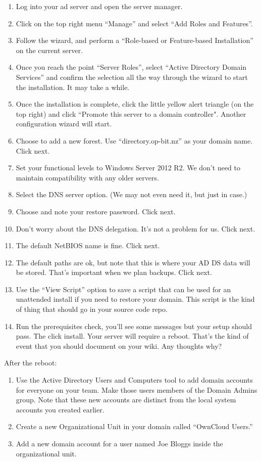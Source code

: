 \documentclass{article}
\begin{document}
\begin{enumerate}
	\item Log into your ad server and open the server manager.
	\item Click on the top right menu ``Manage'' and select ``Add Roles and Features''.
	\item Follow the wizard, and perform a ``Role-based or Feature-based Installation'' on the current server.
	\item Once you reach the point ``Server Roles'', select ``Active Directory Domain Services'' and confirm the selection all the way through the wizard to start the installation. It may take a while.
	\item Once the installation is complete, click the little yellow alert triangle (on the top right) and click ``Promote this server to a domain controller". Another configuration wizard will start.
	\item Choose to add a new forest. Use ``directory.op-bit.nz'' as your domain name. Click next.
	\item Set your functional levels to Windows Server 2012 R2. We don't need to maintain compatibility with any older servers.
	\item Select the DNS server option. (We may not even need it, but just in case.)
	\item Choose and note your restore password. Click next.
	\item Don't worry about the DNS delegation. It's not a problem for us. Click next.
	\item The default NetBIOS name is fine. Click next.
	\item The default paths are ok, but note that this is where your AD DS data will be stored. That's important when we plan backups. Click next.
	\item Use the ``View Script'' option to save a script that can be used for an unattended install if you need to restore your domain. This script is the kind of thing that should go in your source code repo.
	\item Run the prerequisites check, you'll see some messages but your setup should pass. The click install.  Your server will require a reboot. That's the kind of event that you should document on your wiki. Any thoughts why?
\end{enumerate}

After the reboot:
\begin{enumerate}
	\item Use the Active Directory Users and Computers tool to add domain accounts for everyone on your team.  Make those users members of the Domain Admins group. Note that these new accounts are distinct from the local system accounts you created earlier.
	\item Create a new Organizational Unit in your domain called ``OwnCloud  Users.''
	\item Add a new domain account for a user named Joe Bloggs inside the organizational unit.
\end{enumerate}
\end{document}

